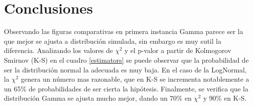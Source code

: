 \documentclass[10pt,a4paper]{article}
\begin{document}
\section{Conclusiones}

Observando las figuras comparativas en primera instancia Gamma parece ser la que mejor se ajusta a distribuci\'on simulada, sin embargo es muy 
sutil la diferencia. 
Analizando los valores de $\chi^2$ y el p-valor a partir de Kolmogorov Smirnov (K-S) en el cuadro \ref{estimators} se puede observar que la probabilidad
de ser la distribuci\'on normal la adecuada es muy baja.
En el caso de la LogNormal, la $\chi^2$ genera un n\'umero mas razonable, que en K-S se incrementa notablemente a un 65\% de probabilidades de ser cierta
la hip\'otesis.
Finalmente, se verifica que la distribuci\'on Gamma se ajusta mucho mejor, dando un 70\% en $\chi^2$ y 90\% en K-S. 
\end{document}
